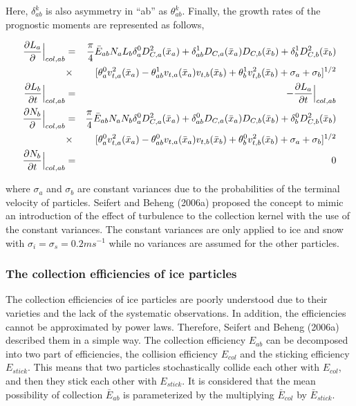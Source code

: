 Here, $\delta_{ab}^{k}$ is also asymmetry in “ab” as $\theta_{ab}^{k}$. Finally, the growth rates of the prognostic moments are represented as follows,


\begin{eqnarray}
\frac{\partial L_{a}}{\partial }\Bigr|_{col,ab}&=&\frac{\pi}{4}\bar{E}_{ab}N_{a}L_{b}{\delta_{a}^{0}D_{C,a}^{2}(\bar{x}_{a})+\delta_{ab}^{1}D_{C,a}(\bar{x}_{a})D_{C,b}(\bar{x}_{b})+\delta_{b}^{1}D_{C,b}^{2}(\bar{x}_{b})}\nonumber\\
&\times&[\theta_{a}^{0}v_{t,a}^{2}(\bar{x}_{a})-\theta_{ab}^{1}v_{t,a}(\bar{x}_{a})v_{t,b}(\bar{x}_{b})+\theta_{b}^{1}v_{t,b}^{2}(\bar{x}_{b})+\sigma_{a}+\sigma_{b}]^{1/2}\label{sn176}\\
\frac{\partial L_{b}}{\partial t}\Bigr|_{col,ab}&=&-\frac{\partial L_{a}}{\partial t}\Bigl|_{col,ab}\label{sn177}\\
\frac{\partial N_{b}}{\partial }\Bigr|_{col,ab}&=&\frac{\pi}{4}\bar{E}_{ab}N_{a}N_{b}{\delta_{a}^{0}D_{C,a}^{2}(\bar{x}_{a})+\delta_{ab}^{0}D_{C,a}(\bar{x}_{a})D_{C,b}(\bar{x}_{b})+\delta_{b}^{0}D_{C,b}^{2}(\bar{x}_{b})}\nonumber\\
&\times&[\theta_{a}^{0}v_{t,a}^{2}(\bar{x}_{a})-\theta_{ab}^{0}v_{t,a}(\bar{x}_{a})v_{t,b}(\bar{x}_{b})+\theta_{b}^{0}v_{t,b}^{2}(\bar{x}_{b})+\sigma_{a}+\sigma_{b}]^{1/2}\label{sn178}\\
\frac{\partial N_{b}}{\partial t}\Bigr|_{col,ab}&=&0\label{sn179}
\end{eqnarray}

where $\sigma_{a}$ and $\sigma_{b}$ are constant variances due to the probabilities of the terminal velocity of particles. Seifert and Beheng (2006a) proposed the concept to mimic an introduction of the effect of turbulence to the collection kernel with the use of the constant variances. The constant variances are only applied to ice and snow with $\sigma_{i}= \sigma_{s} = 0.2 m s^{-1}$ while no variances are assumed for the other particles.

\subsubsection{The collection efficiencies of ice particles}
The collection efficiencies of ice particles are poorly understood due to their varieties and the lack of the systematic observations. In addition, the efficiencies cannot be approximated by power laws. Therefore, Seifert and Beheng (2006a) described them in a simple way. The collection efficiency $E_{ab}$ can be decomposed into two part of efficiencies, the collision efficiency $E_{col}$ and the sticking efficiency $E_{stick}$. This means that two particles stochastically collide each other with $E_{col}$, and then they stick each other with $E_{stick}$. It is considered that the mean possibility of collection $\bar{E}_{ab}$ is parameterized by the multiplying $\bar{E}_{col}$ by $\bar{E}_{stick}$.

